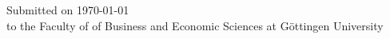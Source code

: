 \begin{titlepage}

{\large Submitted on \today  \\ to the Faculty of of Business and Economic Sciences at Göttingen
University}




\vfill %
\end{titlepage}
\restoregeometry
\clearpage